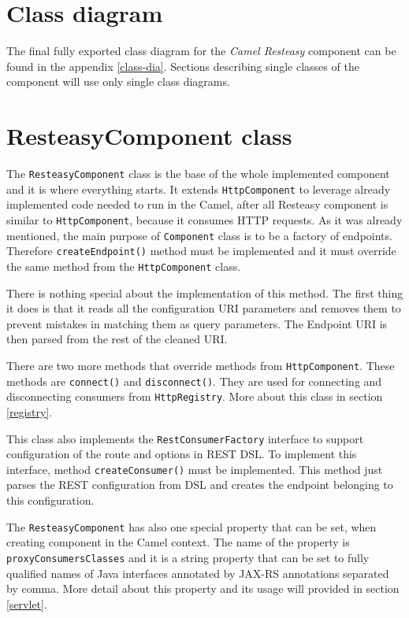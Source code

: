 \documentclass[12pt,final,oneside]{fithesis2}
\begin{document}
\section{Class diagram}
The final fully exported class diagram for the \textit{Camel Resteasy} component can be found in the appendix \ref{class-dia}. Sections describing single classes of the component will use only single class diagrams.

\section{ResteasyComponent class}
The \texttt{ResteasyComponent} class is the base of the whole implemented component and it is where everything starts. It extends \texttt{HttpComponent} to leverage already implemented code needed to run in the Camel, after all Resteasy component is similar to \texttt{HttpComponent}, because it consumes HTTP requests. As it was already mentioned, the main purpose of \texttt{Component} class is to be a factory of endpoints. Therefore \texttt{createEndpoint()} method must be implemented and it must override the same method from the \texttt{HttpComponent} class.

There is nothing special about the implementation of this method. The first thing it does is that it reads all the configuration URI parameters and removes them to prevent mistakes in matching them as query parameters. The Endpoint URI is then parsed from the rest of the cleaned URI.

There are two more methods that override methods from \texttt{HttpCom\-ponent}. These methods are \texttt{connect()} and \texttt{disconnect()}. They are used for connecting and disconnecting consumers from \texttt{HttpRegistry}. More about this class in section \ref{registry}. 

This class also implements the \texttt{RestConsumerFactory} interface to support configuration of the route and options in REST DSL. To implement this interface, method \texttt{createConsumer()} must be implemented. This method just parses the REST configuration from DSL and creates the endpoint belonging to this configuration.

The \texttt{ResteasyComponent} has also one special property that can be set, when creating component in the Camel context. The name of the property is \texttt{proxyConsumersClasses} and it is a string property that can be set to fully qualified names of Java interfaces annotated by JAX-RS annotations separated by comma. More detail about this property and its usage will provided in section \ref{servlet}.
\end{document}
